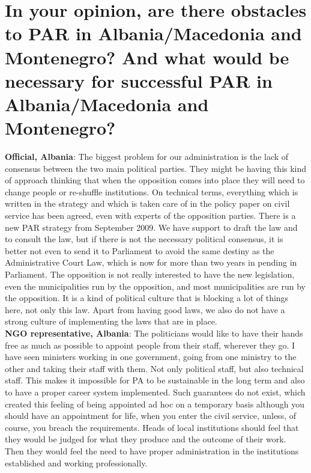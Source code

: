 \section{In your opinion, are there obstacles to PAR in Albania/Macedonia and Montenegro? And what would be necessary for successful PAR in Albania/Macedonia and Montenegro? }
\label{sec:par montenegro}
\textbf{Official, Albania}: The biggest problem for our administration is the lack of consensus between the two main political parties. They might be having this kind of approach thinking that when the opposition comes into place they will need to change people or re-shuffle institutions. On technical terms, everything which is written in the strategy and which is taken care of in the policy paper on civil service has been agreed, even with experts of the opposition parties. There is a new PAR strategy from September 2009. We have support to draft the law and to consult the law, but if there is not the necessary political consensus, it is better not even to send it to Parliament to avoid the same destiny as the Administrative Court Law, which is now for more than two years in pending in Parliament. The opposition is not really interested to have the new legislation, even the municipalities run by the opposition, and most municipalities are run by the opposition. It is a kind of political culture that is blocking a lot of things here, not only this law. Apart from having good laws, we also do not have a strong culture of implementing the laws that are in place. \\
\textbf{NGO representative, Albania}: The politicians would like to have their hands free as much as possible to appoint people from their staff, wherever they go. I have seen ministers working in one government, going from one ministry to the other and taking their staff with them. Not only political staff, but also technical staff. This makes it impossible for PA to be sustainable in the long term and also to have a proper career system implemented. Such guarantees do not exist, which created this feeling of being appointed ad hoc on a temporary basis although you should have an appointment for life, when you enter the civil service, unless, of course, you breach the requirements. Heads of local institutions should feel that they would be judged for what they produce and the outcome of their work. Then they would feel the need to have proper administration in the institutions established and working professionally.  \\
